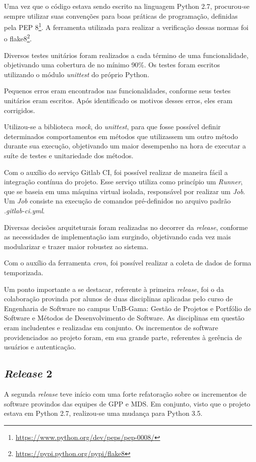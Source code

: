 Uma vez que o código estava sendo escrito na linguagem Python 2.7, procurou-se sempre utilizar suas convenções para boas práticas de programação, definidas pela PEP 8\footnote{\url{https://www.python.org/dev/peps/pep-0008/}}. A ferramenta utilizada para realizar a verificação dessas normas foi o flake8\footnote{\url{https://pypi.python.org/pypi/flake8}}.

Diversos testes unitários foram realizados a cada término de uma funcionalidade, objetivando uma cobertura de no mínimo 90\%. Os testes foram escritos utilizando o módulo \textit{unittest} do próprio Python.

Pequenos erros eram encontrados nas funcionalidades, conforme seus testes unitários eram escritos. Após identificado os motivos desses erros, eles eram corrigidos.

Utilizou-se a biblioteca \textit{mock}, do \textit{unittest}, para que fosse possível definir determinados comportamentos em métodos que utilizassem um outro método durante sua execução, objetivando um maior desempenho na hora de executar a suíte de testes e unitariedade dos métodos.

Com o auxílio do serviço Gitlab CI, foi possível realizar de maneira fácil a integração contínua do projeto. Esse serviço utiliza como princípio um \textit{Runner}, que se baseia em uma máquina virtual isolada, responsável por realizar um \textit{Job}. Um \textit{Job} consiste na execução de comandos pré-definidos no arquivo padrão \textit{.gitlab-ci.yml}.

Diversas decisões arquiteturais foram realizadas no decorrer da \textit{release}, conforme as necessidades de implementação iam surgindo, objetivando cada vez mais modularizar e trazer maior robustez ao sistema.

Com o auxílio da ferramenta \textit{cron}, foi possível realizar a coleta de dados de forma temporizada.

Um ponto importante a se destacar, referente à primeira \textit{release}, foi o da colaboração provinda por alunos de duas disciplinas aplicadas pelo curso de Engenharia de Software no campus UnB-Gama: Gestão de Projetos e Portfólio de Software e Métodos de Desenvolvimento de Software. As disciplinas em questão eram includentes e realizadas em conjunto. Os incrementos de software providenciados ao projeto foram, em sua grande parte, referentes à gerência de usuários e autenticação.

\subsection{\textit{Release} 2}
A segunda \textit{release} teve início com uma forte refatoração sobre os incrementos de software provindos das equipes de GPP e MDS. Em conjunto, visto que o projeto estava em Python 2.7, realizou-se uma mudança para Python 3.5.

